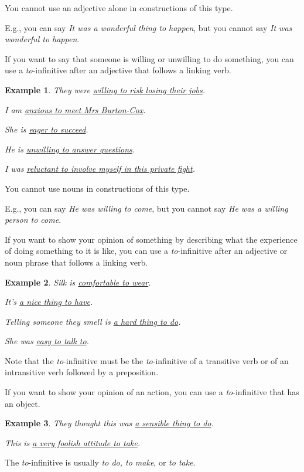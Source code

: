 \documentclass[oneside]{book}
\numberwithin{equation}{section}
\newtheorem{example}{Example}[section]
\begin{document}
%
You cannot use an adjective alone in constructions of this type.

E.g., you can say \textit{It was a wonderful thing to happen}, but you cannot say \textit{It was wonderful to happen}.

%
\noindent{} If you want to say that someone is willing or unwilling to do something, you can use a \textit{to}-infinitive after an adjective that follows a linking verb.
\begin{example}
    They were \underline{willing to risk losing their jobs}.
    
    I am \underline{anxious to meet Mrs Burton-Cox}.
    
    She is \underline{eager to succeed}.
    
    He is \underline{unwilling to answer questions}.
    
    I was \underline{reluctant to involve myself in this private fight}.
\end{example}
You cannot use nouns in constructions of this type.

E.g., you can say \textit{He was willing to come}, but you cannot say \textit{He was a willing person to come}.

%
\noindent{} If you want to show your opinion of something by describing what the experience of doing something to it is like, you can use a \textit{to}-infinitive after an adjective or noun phrase that follows a linking verb.
\begin{example}
    Silk is \underline{comfortable to wear}.
    
    It's \underline{a nice thing to have}.
    
    Telling someone they smell is \underline{a hard thing to do}.
    
    She was \underline{easy to talk to}.
\end{example}
Note that the \textit{to}-infinitive must be the \textit{to}-infinitive of a transitive verb or of an intransitive verb followed by a preposition.

%
\noindent{} If you want to show your opinion of an action, you can use a \textit{to}-infinitive that has an object.
\begin{example}
    They thought this was \underline{a sensible thing to do}.
    
    This is \underline{a very foolish attitude to take}.
\end{example}
The \textit{to}-infinitive is usually \textit{to do, to make}, or \textit{to take}.
\end{document}
